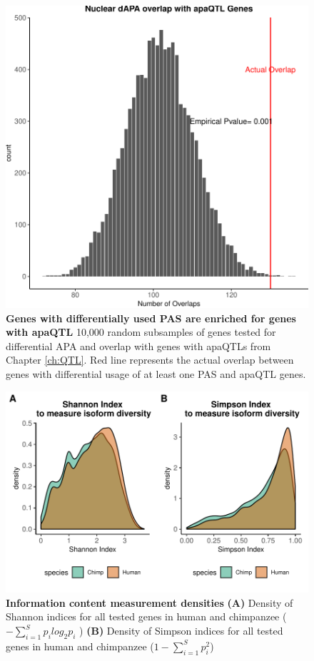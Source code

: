 \begin{figure}[!htb]
\centering
\includegraphics[width=5in]{img/ch03/Fig2_figSup3.pdf}
\caption[Genes with differentially used PAS are enriched for genes with apaQTL ]{\textbf{Genes with differentially used PAS are enriched for genes with apaQTL} 10,000 random subsamples of genes tested for differential APA and overlap with genes with apaQTLs from Chapter \ref{ch:QTL}. Red line represents the actual overlap between genes with differential usage of at least one PAS and apaQTL genes.}
\label{fig:ch03-dPASQTL}
\end{figure}
\clearpage

\begin{figure}[!htb]
\centering
\includegraphics[width=5in]{img/ch03/Fig2-figSup4.pdf}
\caption[Information content measurement densities]{\textbf{Information content measurement densities} {\bf (A)}  Density of Shannon indices for all tested genes in human and chimpanzee ( $- \sum_{i=1}^{S} p_{i}log_{2}p_{i}$ ) {\bf (B)}  Density of Simpson indices for all tested genes in human and chimpanzee ($1 - \sum_{i=1}^{S} p^{2}_{i}$)  }
\label{fig:ch03-bothDensities}
\end{figure}
\clearpage


